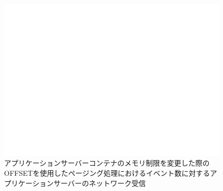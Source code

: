 \documentclass[../../../../../main]{subfiles}
\begin{document}
    \begin{figure}[H]
        \centering
        \includegraphics[width=12cm]{graph}
        \caption{アプリケーションサーバーコンテナのメモリ制限を変更した際のOFFSETを使用したページング処理におけるイベント数に対するアプリケーションサーバーのネットワーク受信}
        \label{fig:paging-offset-change-app-memory-limit-app-net-in-app_4_db_1_1024}
    \end{figure}
\end{document}
